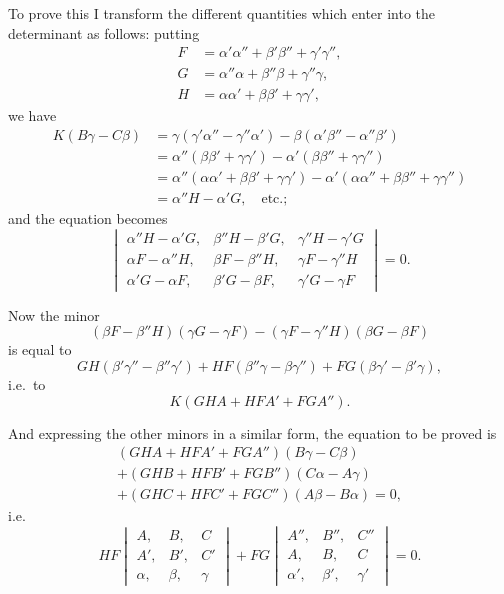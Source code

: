 \documentclass[11pt,a4paper]{book}
\begin{document}
To prove this I transform the different quantities which enter into the determinant as follows: putting
\begin{align*}
F &= \alpha'\alpha'' + \beta'\beta'' + \gamma'\gamma'', \\
G &= \alpha''\alpha + \beta''\beta + \gamma''\gamma, \\
H &= \alpha\alpha' + \beta\beta' + \gamma\gamma',
\end{align*}
we have
\begin{align*}
K(B\gamma - C\beta) &= \gamma(\gamma'\alpha'' - \gamma''\alpha') - \beta(\alpha'\beta'' - \alpha''\beta') \\
&= \alpha''(\beta\beta' + \gamma\gamma') - \alpha'(\beta\beta'' + \gamma\gamma'') \\
&= \alpha''(\alpha\alpha' + \beta\beta' + \gamma\gamma') - \alpha'(\alpha\alpha'' + \beta\beta'' + \gamma\gamma'') \\
&= \alpha'' H - \alpha' G, \quad \text{etc.};
\end{align*}
and the equation becomes
\[
\begin{vmatrix}
\alpha'' H - \alpha' G, & \beta'' H - \beta' G, & \gamma'' H - \gamma' G \\
\alpha F - \alpha'' H, & \beta F - \beta'' H, & \gamma F - \gamma'' H \\
\alpha' G - \alpha F, & \beta' G - \beta F, & \gamma' G - \gamma F
\end{vmatrix}
= 0.
\]

Now the minor
\[
(\beta F - \beta'' H)(\gamma G - \gamma F) - (\gamma F - \gamma'' H)(\beta G - \beta F)
\]
is equal to
\[
GH(\beta'\gamma'' - \beta''\gamma') + HF(\beta''\gamma - \beta\gamma'') + FG(\beta\gamma' - \beta'\gamma),
\]
i.e.\ to
\[
K(GHA + HFA' + FGA'').
\]

And expressing the other minors in a similar form, the equation to be proved is
\begin{multline*}
(GHA + HFA' + FGA'') (B\gamma - C\beta) \\
+ (GHB + HFB' + FGB'') (C\alpha - A\gamma) \\
+ (GHC + HFC' + FGC'') (A\beta - B\alpha) = 0,
\end{multline*}
i.e.
\[
HF
\begin{vmatrix}
A, & B, & C \\
A', & B', & C' \\
\alpha, & \beta, & \gamma
\end{vmatrix}
+
FG
\begin{vmatrix}
A'', & B'', & C'' \\
A, & B, & C \\
\alpha', & \beta', & \gamma'
\end{vmatrix}
= 0.
\]
\end{document}
